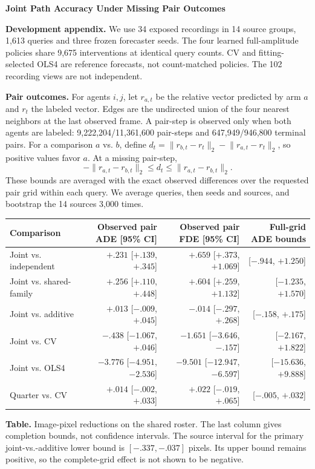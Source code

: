 \documentclass[10pt,letterpaper]{article}
\begin{document}
{\Large\bfseries Joint Path Accuracy Under Missing Pair Outcomes}

\textbf{Development appendix.} We use 34 exposed recordings in 14 source
groups, 1,613 queries and three frozen forecaster seeds. The four learned
full-amplitude policies share 9,675 interventions at identical query
counts. CV and fitting-selected OLS4 are reference forecasts, not
count-matched policies. The 102 recording views are not independent.

\textbf{Pair outcomes.} For agents $i,j$, let $r_{a,t}$ be the relative
vector predicted by arm $a$ and $r_t$ the labeled vector. Edges are the
undirected union of the four nearest neighbors at the last observed
frame. A pair-step is observed only when both agents are labeled:
9,222,204/11,361,600 pair-steps and 647,949/946,800 terminal pairs.
For a comparison $a$ vs. $b$, define
$d_t=\lVert r_{b,t}-r_t\rVert_2-\lVert r_{a,t}-r_t\rVert_2$,
so positive values favor $a$. At a missing pair-step,
\[
 -\lVert r_{a,t}-r_{b,t}\rVert_2 \leq d_t
 \leq \lVert r_{a,t}-r_{b,t}\rVert_2.
\]
These bounds are averaged with the exact observed differences over
the requested pair grid within each query. We average queries, then
seeds and sources, and bootstrap the 14 sources 3,000 times.

\begin{center}
\small
\begin{tabular}{@{}lrrr@{}}
\toprule
Comparison & Observed pair ADE [95\% CI] & Observed pair FDE [95\% CI] & Full-grid ADE bounds \\
\midrule
Joint vs. independent & $+.231$ [$+.139$, $+.345$] & $+.659$ [$+.373$, $+1.069$] & [$-.944$, $+1.250$] \\
Joint vs. shared-family & $+.256$ [$+.110$, $+.448$] & $+.604$ [$+.259$, $+1.132$] & [$-1.235$, $+1.570$] \\
Joint vs. additive & $+.013$ [$-.009$, $+.045$] & $-.014$ [$-.297$, $+.268$] & [$-.158$, $+.175$] \\
Joint vs. CV & $-.438$ [$-1.067$, $+.046$] & $-1.651$ [$-3.646$, $-.157$] & [$-2.167$, $+1.822$] \\
Joint vs. OLS4 & $-3.776$ [$-4.951$, $-2.536$] & $-9.501$ [$-12.947$, $-6.597$] & [$-15.636$, $+9.888$] \\
Quarter vs. CV & $+.014$ [$-.002$, $+.033$] & $+.022$ [$-.019$, $+.065$] & [$-.005$, $+.032$] \\
\bottomrule
\end{tabular}
\end{center}
\textbf{Table.} Image-pixel reductions on the shared roster. The last
column gives completion bounds, not confidence intervals. The source
interval for the primary joint-vs.-additive lower bound is
$[-.337,-.037]$ pixels. Its upper bound remains positive, so the
complete-grid effect is not shown to be negative.
\end{document}
